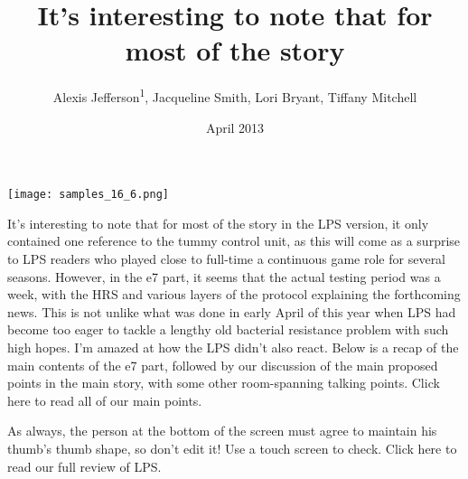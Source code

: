 \documentclass{article}
\title{It’s interesting to note that for most of the story}
\author{Alexis Jefferson\textsuperscript{1},  Jacqueline Smith,  Lori Bryant,  Tiffany Mitchell}
\affil{\textsuperscript{1}University of Maryland}
\date{April 2013}
\begin{document}
\maketitle

\begin{center}
\begin{minipage}{0.75\linewidth}
\texttt{[image: samples\_16\_6.png]}
\end{minipage}
\end{center}

It’s interesting to note that for most of the story in the LPS version, it only contained one reference to the tummy control unit, as this will come as a surprise to LPS readers who played close to full-time a continuous game role for several seasons. However, in the e7 part, it seems that the actual testing period was a week, with the HRS and various layers of the protocol explaining the forthcoming news. This is not unlike what was done in early April of this year when LPS had become too eager to tackle a lengthy old bacterial resistance problem with such high hopes. I’m amazed at how the LPS didn’t also react. Below is a recap of the main contents of the e7 part, followed by our discussion of the main proposed points in the main story, with some other room-spanning talking points. Click here to read all of our main points.

As always, the person at the bottom of the screen must agree to maintain his thumb’s thumb shape, so don’t edit it! Use a touch screen to check. Click here to read our full review of LPS.
\end{document}

